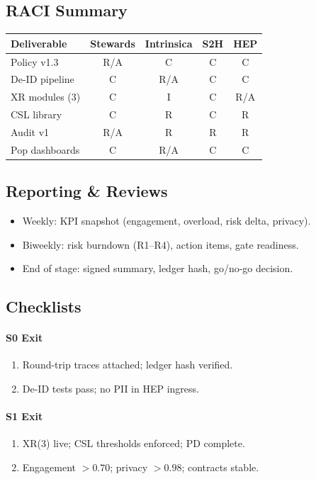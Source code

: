 \documentclass[11pt]{article}
\theoremstyle{plain}
\begin{document}
\subsection{RACI Summary}
\begin{center}
\begin{tabular}{l c c c c}
\hline
Deliverable & Stewards & Intrinsica & S2H & HEP \\
\hline
Policy v1.3 & R/A & C & C & C \\
De-ID pipeline & C & R/A & C & C \\
XR modules (3) & C & I & C & R/A \\
CSL library & C & R & C & R \\
Audit v1 & R/A & R & R & R \\
Pop dashboards & C & R/A & C & C \\
\hline
\end{tabular}
\end{center}

\subsection{Reporting \& Reviews}
\begin{itemize}
  \item Weekly: KPI snapshot (engagement, overload, risk delta, privacy).
  \item Biweekly: risk burndown (R1–R4), action items, gate readiness.
  \item End of stage: signed summary, ledger hash, go/no-go decision.
\end{itemize}

\subsection{Checklists}
\paragraph{S0 Exit}
\begin{enumerate}
  \item Round-trip traces attached; ledger hash verified.
  \item De-ID tests pass; no PII in HEP ingress.
\end{enumerate}

\paragraph{S1 Exit}
\begin{enumerate}
  \item XR(3) live; CSL thresholds enforced; PD complete.
  \item Engagement $>0.70$; privacy $>0.98$; contracts stable.
\end{enumerate}
\end{document}
